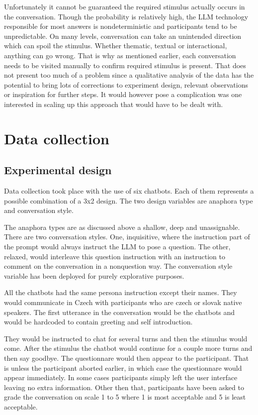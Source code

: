 \documentclass[12pt]{report}
\begin{document}
{Unfortunately it cannot be guaranteed
the required stimulus actually occurs in the conversation.
Though the probability is relatively high,
the LLM technology responsible for most answers
is nondeterministic
and participants tend to be unpredictable.
On many levels, conversation can take an unintended direction
which can spoil the stimulus.
Whether thematic, textual or interactional,
anything can go wrong.
That is why as mentioned earlier,
each conversation needs to be visited manually
to confirm required stimulus is present.
That does not present too much of a problem
since a qualitative analysis of the data
has the potential to bring lots of
corrections to experiment design,
relevant observations or
inspiration for further steps.
It would however pose a complication
was one interested in scaling up this approach
that would have to be dealt with.

\section{Data collection}

\subsection{Experimental design}

Data collection took place with the use of six chatbots.
Each of them represents a possible combination of a 3x2 design.
The two design variables are anaphora type and conversation style.

The anaphora types are as discussed above a shallow, deep and unassignable.
There are two conversation styles. One, inquisitive,
where the instruction part of the prompt
would always instruct the LLM to pose a question.
The other, relaxed, would interleave this question instruction with
an instruction to comment on the conversation in a nonquestion way.
The conversation style variable has been deployed for purely explorative purposes.

All the chatbots had the same persona instruction except their names.
They would communicate in Czech with participants who are czech or slovak native speakers.
The first utterance in the conversation would be the chatbots and
would be hardcoded to contain greeting and self introduction.

They would be instructed to chat for several turns and then the stimulus would come.
After the stimulus the chatbot would continue for a couple more turns and then say goodbye.
The questionnare would then appear to the participant.
That is unless the participant aborted earlier, in which case the questionnare would appear immediately.
In some cases participants simply left the user interface leaving no extra information.
Other then that, participants have been asked to grade the conversation on scale 1 to 5
where 1 is most acceptable and 5 is least acceptable.

}
\end{document}
